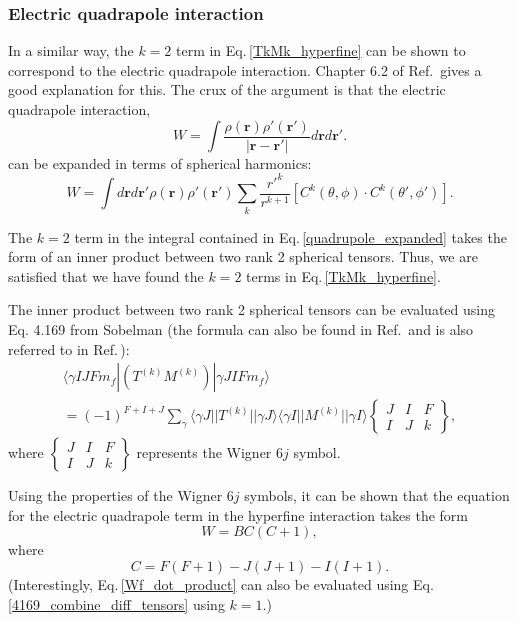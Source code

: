 \subsubsection{Electric quadrapole interaction}
In a similar way, the $k=2$ term in Eq.\,\eqref{TkMk_hyperfine} can be shown to correspond to the electric quadrapole interaction. Chapter 6.2 of Ref.\,\cite{sobelman_spectra} gives a good explanation for this. The crux of the argument is that the electric quadrapole interaction,
\begin{equation}
W=\int\frac{\rho(\mathbf{r})\rho'(\mathbf{r}')}{|\mathbf{r}-\mathbf{r}'|}d\mathbf{r}d\mathbf{r'}.
\end{equation}
can  be expanded in terms of spherical harmonics: 
\begin{equation}
W=\int d\mathbf{r}d\mathbf{r'}
\rho(\mathbf{r})\rho'(\mathbf{r}')\sum_k \frac{r'^k}{r^{k+1}}[C^k(\theta,\phi)\cdot C^k(\theta',\phi')] \label{quadrupole_expanded}.
\end{equation}

The $k=2$ term in the integral contained in Eq.\,\ref{quadrupole_expanded} takes the form of an inner product between two rank 2 spherical tensors. Thus, we are satisfied that we have found the $k=2$ terms in Eq.\,\eqref{TkMk_hyperfine}.

The inner product between two rank 2 spherical tensors can be evaluated using Eq. 4.169 from Sobelman \cite{sobelman_spectra} (the formula can also be found in Ref.\,\cite{Racah2} and is also referred to in Ref.\,\cite{schwartz_hyperfine_expansion}):
\begin{multline}\label{4169_combine_diff_tensors}
\langle\gamma I J F m_f|(T^{(k)}M^{(k)})|\gamma J I F m_f\rangle \\
=
(-1)^{F+I+J} \sum_{\gamma} \langle\gamma J||T^{(k)}||\gamma J\rangle
\langle\gamma I || M^{(k)} ||\gamma I\rangle
\begin{Bmatrix}
J & I & F \\
I & J & k
\end{Bmatrix},
\end{multline}
where 
$\begin{Bmatrix}
J & I & F \\
I & J & k
\end{Bmatrix}$ represents the Wigner $6j$ symbol. 

Using the properties of the Wigner $6j$ symbols, it can be shown that %
the equation for the electric quadrapole term in the hyperfine interaction takes the form \cite{cuaMITnotes}\cite{sobelman_spectra} 
\begin{equation}\label{justQuadrupole}
W=BC(C+1),
\end{equation}
where 
\begin{equation}
C=F(F+1)-J(J+1)-I(I+1).
\end{equation}
(Interestingly, Eq.\,\ref{Wf_dot_product} can also be evaluated using Eq.\,\ref{4169_combine_diff_tensors} using $k=1$.)

